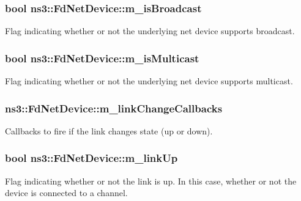 \subsubsection[{\texorpdfstring{m\+\_\+is\+Broadcast}{m_isBroadcast}}]{\setlength{\rightskip}{0pt plus 5cm}bool ns3\+::\+Fd\+Net\+Device\+::m\+\_\+is\+Broadcast\hspace{0.3cm}{\ttfamily [private]}}\hypertarget{classns3_1_1FdNetDevice_a0c9a5b7d7802458647ac8f2af3e80176}{}\label{classns3_1_1FdNetDevice_a0c9a5b7d7802458647ac8f2af3e80176}
Flag indicating whether or not the underlying net device supports broadcast. 
\subsubsection[{\texorpdfstring{m\+\_\+is\+Multicast}{m_isMulticast}}]{\setlength{\rightskip}{0pt plus 5cm}bool ns3\+::\+Fd\+Net\+Device\+::m\+\_\+is\+Multicast\hspace{0.3cm}{\ttfamily [private]}}\hypertarget{classns3_1_1FdNetDevice_a781a28aa762e85bca94a29f3686ee15b}{}\label{classns3_1_1FdNetDevice_a781a28aa762e85bca94a29f3686ee15b}
Flag indicating whether or not the underlying net device supports multicast. 
\subsubsection[{\texorpdfstring{m\+\_\+link\+Change\+Callbacks}{m_linkChangeCallbacks}}]{ ns3\+::\+Fd\+Net\+Device\+::m\+\_\+link\+Change\+Callbacks\hspace{0.3cm}{\ttfamily [private]}}\hypertarget{classns3_1_1FdNetDevice_a3e8d275156225016c9e518ae5429ade7}{}\label{classns3_1_1FdNetDevice_a3e8d275156225016c9e518ae5429ade7}
Callbacks to fire if the link changes state (up or down). 
\subsubsection[{\texorpdfstring{m\+\_\+link\+Up}{m_linkUp}}]{\setlength{\rightskip}{0pt plus 5cm}bool ns3\+::\+Fd\+Net\+Device\+::m\+\_\+link\+Up\hspace{0.3cm}{\ttfamily [private]}}\hypertarget{classns3_1_1FdNetDevice_abf646fbe52523693488607b6ee9a7578}{}\label{classns3_1_1FdNetDevice_abf646fbe52523693488607b6ee9a7578}
Flag indicating whether or not the link is up. In this case, whether or not the device is connected to a channel. 
